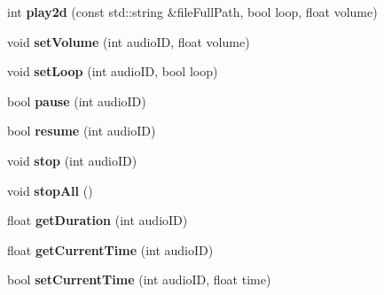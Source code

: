 \begin{DoxyCompactItemize}
int {\bfseries play2d} (const std\+::string \&file\+Full\+Path, bool loop, float volume)
\item 
\mbox{\label{classexperimental_1_1AudioEngineImpl_aaa11ae7fe8bfd4c4365c02aa71f119b0}} 
void {\bfseries set\+Volume} (int audio\+ID, float volume)
\item 
\mbox{\label{classexperimental_1_1AudioEngineImpl_afd6600a03fa747d44c79f09fbc41b373}} 
void {\bfseries set\+Loop} (int audio\+ID, bool loop)
\item 
\mbox{\label{classexperimental_1_1AudioEngineImpl_a4b7cd4c0f622f263dee4f8067cc364a1}} 
bool {\bfseries pause} (int audio\+ID)
\item 
\mbox{\label{classexperimental_1_1AudioEngineImpl_a300f339e4c5178c84522fe8654898e43}} 
bool {\bfseries resume} (int audio\+ID)
\item 
\mbox{\label{classexperimental_1_1AudioEngineImpl_a56856900e92d2a4c19ea1a629bf19393}} 
void {\bfseries stop} (int audio\+ID)
\item 
\mbox{\label{classexperimental_1_1AudioEngineImpl_abcf87e42d6015ae5a0760ce815fb6f28}} 
void {\bfseries stop\+All} ()
\item 
\mbox{\label{classexperimental_1_1AudioEngineImpl_a12fa2f700f4d6e4effc72e1ad7e030cb}} 
float {\bfseries get\+Duration} (int audio\+ID)
\item 
\mbox{\label{classexperimental_1_1AudioEngineImpl_a47be5365efeebd307e3891f3f71386f0}} 
float {\bfseries get\+Current\+Time} (int audio\+ID)
\item 
\mbox{\label{classexperimental_1_1AudioEngineImpl_a8abd3b8330fb7ca7f513016055333f9c}} 
bool {\bfseries set\+Current\+Time} (int audio\+ID, float time)
\item 
\mbox{\label{classexperimental_1_1AudioEngineImpl_ab4bc0ee1754fda9638d7d0c4470cf170}} 

\end{DoxyCompactItemize}
